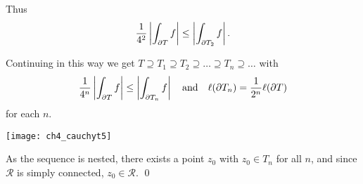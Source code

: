 \begin{center}
\end{center}

\begin{blankbox}
Thus 
\[
\frac{1}{4^2} \left|  \int_{\partial T} f  \right| \leq \left|  \int_{\partial T_2} f  \right|.
\]


Continuing in this way we get $T\supseteq T_1 \supseteq T_2 \supseteq \ldots \supseteq T_n \supseteq \ldots$ with 
\[
\frac{1}{4^n} \left|  \int_{\partial T} f \right| \leq \left|  \int_{\partial T_n} f  \right|\quad\text{and}\quad \ell(\partial T_n) = \frac{1}{2^n} \ell ( \partial T)
\]
for each $n$.
\end{blankbox}
\begin{center}
\texttt{[image: ch4\_cauchyt5]}
\end{center}


As the sequence is nested, there exists a point $z_0$ with $z_0 \in T_n$ for all $n$, and since $\mathcal{R}$ is simply connected, $z_0 \in \mathcal{R}$.
\qed

